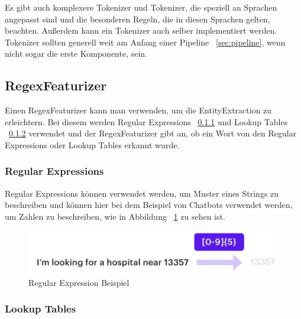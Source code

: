 Es gibt auch komplexere Tokenizer und Tokenizer, die speziell an Sprachen angepasst sind und die besonderen Regeln, die in diesen Sprachen gelten, beachten.
Außerdem kann ein Tokenizer auch selber implementiert werden.\cite{whitespaceTokenizer, rasaMasterclassWhitespaceTokenizer, pipelineComponentsYoutube}
Tokenizer sollten generell weit am Anfang einer Pipeline ~\ref{sec:pipeline}, wenn nicht sogar die erste Komponente, sein.

\subsection{RegexFeaturizer}\label{subsec:regex-featurizer}

Einen RegexFeaturizer kann man verwenden, um die EntityExtraction zu erleichtern.
Bei diesem werden Regular Expressions ~\ref{subsubsec:regex-featurizer-regex} und Lookup Tables ~\ref{subsubsec:lookup-tables} verwendet und der RegexFeaturizer gibt an, ob ein Wort von den Regular Expressions oder Lookup Tables erkannt wurde.\cite{rasaMasterclassRegexFeaturizer, pipelineComponentsYoutube, regexFeaturizerCrf}

\subsubsection{Regular Expressions}\label{subsubsec:regex-featurizer-regex}

Regular Expressions können verwendet werden, um Muster eines Strings zu beschreiben und können hier bei dem Beispiel von Chatbots verwendet werden, um Zahlen zu beschreiben, wie in Abbildung ~\ref{fig:Regular Expression Beispiel} zu sehen ist.\cite{rasaMasterclassRegexFeaturizer, pipelineComponentsYoutube, regexFeaturizerCrf}

\begin{figure}[hbt!]
    \centering
    \includegraphics[scale=0.5]{pics/regular-expression-example}
    \caption{Regular Expression Beispiel~\cite{pipelineComponentsYoutube}}
    \label{fig:Regular Expression Beispiel}
\end{figure}

\subsubsection{Lookup Tables}\label{subsubsec:lookup-tables}

